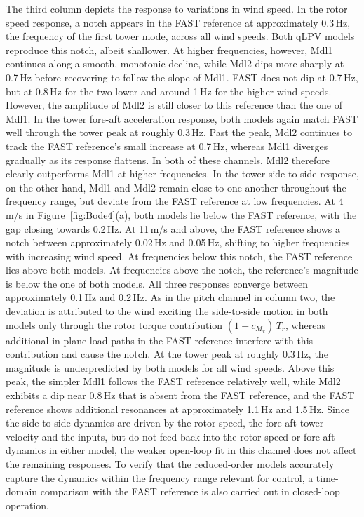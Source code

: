     The third column depicts the response to variations in wind speed. In the rotor speed response, a notch appears in the FAST reference at approximately 0.3\,Hz, the frequency of the first tower mode, across all wind speeds. Both qLPV models reproduce this notch, albeit shallower. At higher frequencies, however, Mdl1 continues along a smooth, monotonic decline, while Mdl2 dips more sharply at 0.7\,Hz before recovering to follow the slope of Mdl1. FAST does not dip at 0.7\,Hz, but at 0.8\,Hz for the two lower and around 1\,Hz for the higher wind speeds. However, the amplitude of Mdl2 is still closer to this reference than the one of Mdl1. In the tower fore-aft acceleration response, both models again match FAST well through the tower peak at roughly 0.3\,Hz. Past the peak, Mdl2 continues to track the FAST reference's small increase at 0.7\,Hz, whereas Mdl1 diverges gradually as its response flattens. In both of these channels, Mdl2 therefore clearly outperforms Mdl1 at higher frequencies. In the tower side-to-side response, on the other hand, Mdl1 and Mdl2 remain close to one another throughout the frequency range, but deviate from the FAST reference at low frequencies. At 4\,m/s in Figure~\ref{fig:Bode4}(a), both models lie below the FAST reference, with the gap closing towards 0.2\,Hz. At 11\,m/s and above, the FAST reference shows a notch between approximately 0.02\,Hz and 0.05\,Hz, shifting to higher frequencies with increasing wind speed. At frequencies below this notch, the FAST reference lies above both models. At frequencies above the notch, the reference's magnitude is below the one of both models. All three responses converge between approximately 0.1\,Hz and 0.2\,Hz. As in the pitch channel in column two, the deviation is attributed to the wind exciting the side-to-side motion in both models only through the rotor torque contribution $(1-c_{M_x})\,T_r$, whereas additional in-plane load paths in the FAST reference interfere with this contribution and cause the notch. At the tower peak at roughly 0.3\,Hz, the magnitude is underpredicted by both models for all wind speeds. Above this peak, the simpler Mdl1 follows the FAST reference relatively well, while Mdl2 exhibits a dip near 0.8\,Hz that is absent from the FAST reference, and the FAST reference shows additional resonances at approximately 1.1\,Hz and 1.5\,Hz. Since the side-to-side dynamics are driven by the rotor speed, the fore-aft tower velocity and the inputs, but do not feed back into the rotor speed or fore-aft dynamics in either model, the weaker open-loop fit in this channel does not affect the remaining responses. To verify that the reduced-order models accurately capture the dynamics within the frequency range relevant for control, a time-domain comparison with the FAST reference is also carried out in closed-loop operation.
    
